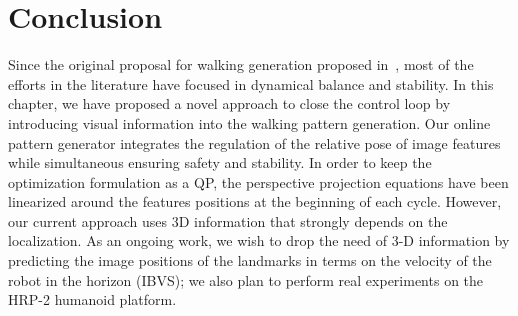 \section{Conclusion}
\label{sec:conclusions}
Since the original proposal for walking generation proposed in~\citep{Kajita2003}, most of the efforts in the literature have focused in dynamical balance and stability. In this chapter, we have proposed a novel approach to close the control loop by introducing visual information into the walking pattern generation. Our online pattern generator integrates the regulation of the relative pose of image features while simultaneous ensuring safety and stability. In order to keep the optimization formulation as a QP, the perspective projection equations have been linearized around the features positions at the beginning of each cycle. However, our current approach uses 3D information that strongly depends on the localization. As an ongoing work, we wish to drop the need of 3-D information by predicting the image positions of the landmarks in terms on the velocity of the robot in the horizon (IBVS); we also plan to perform real experiments on the HRP-2 humanoid platform.

